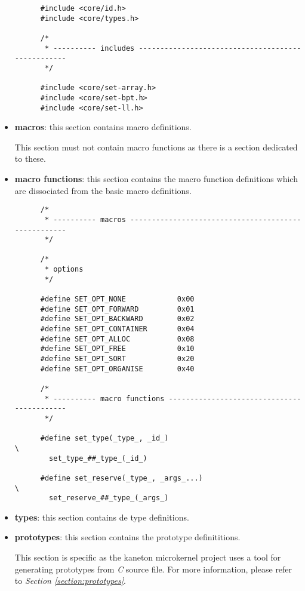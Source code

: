 \begin{itemize}
\begin{verbatim}
      #include <core/id.h>
      #include <core/types.h>

      /*
       * ---------- includes --------------------------------------------------
       */

      #include <core/set-array.h>
      #include <core/set-bpt.h>
      #include <core/set-ll.h>
    \end{verbatim}
  \item
    \textbf{macros}: this section contains macro definitions.

    \-

    This section must not contain macro functions as there is a section
    dedicated to these.
  \item
    \textbf{macro functions}: this section contains the macro function
    definitions which are dissociated from the basic macro definitions.

    \begin{verbatim}
      /*
       * ---------- macros ----------------------------------------------------
       */

      /*
       * options
       */

      #define SET_OPT_NONE            0x00
      #define SET_OPT_FORWARD         0x01
      #define SET_OPT_BACKWARD        0x02
      #define SET_OPT_CONTAINER       0x04
      #define SET_OPT_ALLOC           0x08
      #define SET_OPT_FREE            0x10
      #define SET_OPT_SORT            0x20
      #define SET_OPT_ORGANISE        0x40

      /*
       * ---------- macro functions -------------------------------------------
       */

      #define set_type(_type_, _id_)                                    \
        set_type_##_type_(_id_)

      #define set_reserve(_type_, _args_...)                            \
        set_reserve_##_type_(_args_)
    \end{verbatim}
  \item
    \textbf{types}: this section contains de type definitions.
  \item
    \textbf{prototypes}: this section contains the prototype definititions.

    \-

    This section is specific as the kaneton microkernel project uses a
    tool for generating prototypes from \textit{C} source file. For more
    information, please refer to \textit{Section \ref{section:prototypes}}.


\end{itemize}
